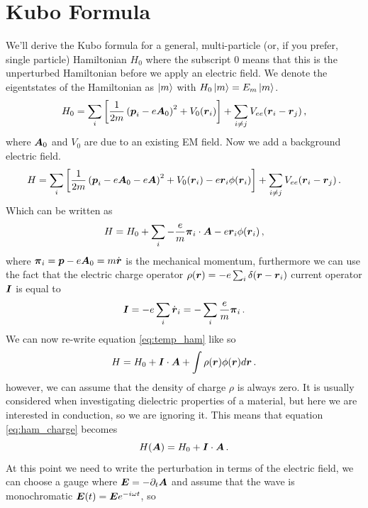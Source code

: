 \section{Kubo Formula}
We'll derive the Kubo formula for a general, multi-particle (or, if you prefer, single particle) Hamiltonian $H_0$ where the subscript 0 means that this is the unperturbed Hamiltonian before we apply an electric field. We denote the eigentstates of the Hamiltonian as $\ket m$ with $H_0\ket m=E_m \ket m$.
\begin{equation}
    H_0=\sum_i\left[\frac{1}{2m}\left(\boldsymbol{p}_i-e\boldsymbol{A}_0\right)^2 + V_0(\boldsymbol{r}_i)\right]+\sum_{i\neq j}V_{ee}(\boldsymbol{r}_i-\boldsymbol{r}_j)\,,
\end{equation}
where $\boldsymbol{A}_0$ and $V_0$ are due to an existing EM field. Now we add a background electric field.
\begin{equation}
    H=\sum_i\left[\frac{1}{2m}\left(\boldsymbol{p}_i-e\boldsymbol{A}_0 - e\boldsymbol{A}\right)^2 + V_0(\boldsymbol{r}_i) - e\boldsymbol{r}_i\phi(\boldsymbol{r}_i)\right]+\sum_{i\neq j}V_{ee}(\boldsymbol{r}_i-\boldsymbol{r}_j)\,.
\end{equation}
Which can be written as 
\begin{equation}
    H=H_0 + \sum_{i}-\frac{e}m \boldsymbol \pi_i\cdot \boldsymbol{A} - e\boldsymbol{r}_i\phi(\boldsymbol{r}_i)\,,
    \label{eq:temp_ham}
\end{equation}
where $\boldsymbol \pi_i=\boldsymbol{p} -e\boldsymbol{A}_0=m\dot{\boldsymbol{r}}$ is the mechanical momentum,
furthermore we can use the fact that the electric charge operator $\rho(\boldsymbol{r})=-e\sum_{i}\delta(\boldsymbol{r}-\boldsymbol{r}_i)$ current operator  $\boldsymbol{I}$ is equal to 
\begin{equation}
    \boldsymbol{I}=-e\sum_{i}\dot{\boldsymbol{r}}_i=-\sum_{i}\frac{e}m \boldsymbol \pi_i\,.
\end{equation}
We can now re-write equation \ref{eq:temp_ham} like so
\begin{equation}
    H=H_0+\boldsymbol{I}\cdot \boldsymbol{A} + \int\rho(\boldsymbol{r})\phi(\boldsymbol{r})d\boldsymbol{r}\,.
    \label{eq:ham_charge}
\end{equation}
however, we can assume that the density of charge $\rho$ is always zero. It is usually considered when investigating dielectric properties of a material, but here we are interested in conduction, so we are ignoring it. This means that equation \ref{eq:ham_charge} becomes
\begin{equation}
    H(\boldsymbol{A})=H_0+\boldsymbol{I}\cdot \boldsymbol{A}\,.
    \label{eq:deltaH}
\end{equation}
At this point we need to write the perturbation in terms of the electric field, we can choose a gauge where $\boldsymbol{E}=-\partial_t\boldsymbol{A}$ and assume that the wave is monochromatic $\boldsymbol{E}(t)=\boldsymbol{E}e^{-i\omega t}$, so 
